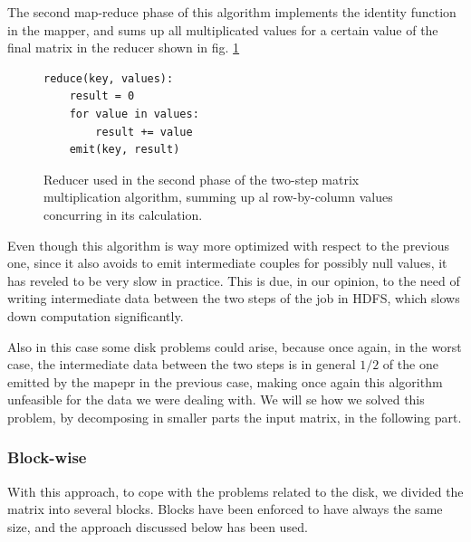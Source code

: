 The second map-reduce phase of this algorithm implements the identity function in the mapper, and sums up all
multiplicated values for a certain value of the final matrix in the reducer shown in fig. \ref{fig:twoStep2Reducer}

\begin{figure}
\begin{verbatim}
reduce(key, values):
    result = 0
    for value in values:
        result += value
    emit(key, result)
\end{verbatim}
\caption{Reducer used in the second phase of the two-step matrix multiplication algorithm, summing up al row-by-column values concurring in its calculation.}
\label{fig:twoStep2Reducer}
\end{figure}
Even though this algorithm is way more optimized with respect to the previous one, since it also avoids to emit intermediate couples for possibly null values, it has reveled to be very slow in practice. This is due, in our opinion, to the need
of writing intermediate data between the two steps of the job in HDFS, which slows down computation significantly.

Also in this case some disk problems could arise, because once again, in the worst case, the intermediate data between the two steps is in general $1/2$ of the one emitted by the mapepr in the previous case, making once again
this algorithm unfeasible for the data we were dealing with.
We will se how we solved this problem, by decomposing in smaller parts the input matrix, in the following part.

\subsubsection{Block-wise}
With this approach, to cope with the problems related to the disk, we divided the matrix into several blocks.
Blocks have been enforced to have always the same size, and the approach discussed below has been used.

